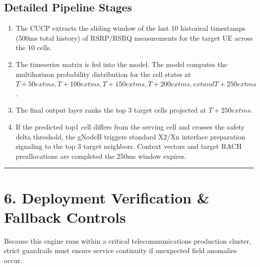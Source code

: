 \documentclass[letterpaper,10pt,english]{sphinxmanual}
\begin{document}
\subsection{Detailed Pipeline Stages}
\label{\detokenize{deployement:detailed-pipeline-stages}}\begin{enumerate}
%
\item {} 
\sphinxAtStartPar
{} The CU\sphinxhyphen{}CP extracts the sliding window of the last 10 historical timestamps (500ms total history) of RSRP/RSRQ measurements for the target UE across the 10 cells.

\item {} 
\sphinxAtStartPar
{} The time\sphinxhyphen{}series matrix is fed into the model. The model computes the multi\sphinxhyphen{}horizon probability distribution for the cell states at \(T+50	ext{ms}, T+100	ext{ms}, T+150	ext{ms}, T+200	ext{ms}, 	ext{ and } T+250	ext{ms}\).

\item {} 
\sphinxAtStartPar
{} The final output layer ranks the top 3 target cells projected at \(T+250	ext{ms}\).

\item {} 
\sphinxAtStartPar
{} If the predicted top\sphinxhyphen{}1 cell differs from the serving cell and crosses the safety delta threshold, the gNodeB triggers standard X2/Xn interface preparation signaling to the top 3 target neighbors. Context vectors and target RACH pre\sphinxhyphen{}allocations are completed  the 250ms window expires.

\end{enumerate}


\bigskip\hrule\bigskip



\section{6. Deployment Verification \& Fallback Controls}
\label{\detokenize{deployement:deployment-verification-fallback-controls}}
\sphinxAtStartPar
Because this engine runs within a critical telecommunications production cluster, strict guardrails must ensure service continuity if unexpected field anomalies occur.
\end{document}

